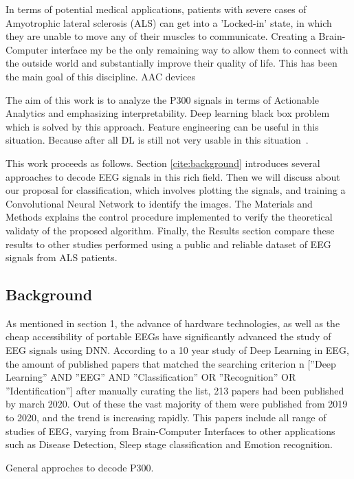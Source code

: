 \documentclass[conference]{IEEEtran}
\begin{document}
In terms of potential medical applications, patients with severe cases of Amyotrophic lateral sclerosis (ALS) can get into a 'Locked-in' state, in which they are unable to move any of their muscles to communicate. Creating a Brain-Computer interface my be the only remaining way to allow them to connect with the outside world and substantially improve their quality of life\cite{vucic.2021,GUY20185}.  This has been the main goal of this discipline. AAC devices

The aim of this work is to analyze the P300 signals in terms of Actionable Analytics and emphasizing interpretability.  
Deep learning black box problem which is solved by this approach.  Feature engineering can be useful in this situation. Because after all DL is still not very usable in this situation~\cite{Sterniuk.etal2021}.


This work proceeds as follows.  Section \ref{cite:background} introduces several approaches to decode EEG signals in this rich field.  Then we will discuss about our proposal for classification, which involves plotting the signals, and training a Convolutional Neural Network to identify the images.  The Materials and Methods explains the control procedure implemented to verify the theoretical validaty of the proposed algorithm. Finally, the Results section compare these results to other studies performed using a public and reliable dataset of EEG signals from ALS patients. 

\subsection{Background}
\label{background}


As mentioned in section 1, the advance of hardware technologies, as well as the cheap accessibility of portable EEGs have significantly advanced the study of EEG signals using DNN. According to a 10 year study of Deep Learning in EEG\cite{dnn10years}, the amount of published papers that matched the searching criterion n [”Deep Learning” AND ”EEG” AND ”Classification” OR ”Recognition” OR ”Identification”] after manually curating the list, 213 papers had been published by march 2020. Out of these the vast majority of them were published from 2019 to 2020, and the trend is increasing rapidly. This papers include all range of studies of EEG, varying from Brain-Computer Interfaces to other applications such as Disease Detection, Sleep stage classification and Emotion recognition. 

General approches to decode P300\cite{Jiannan.etal2021}.
\end{document}
